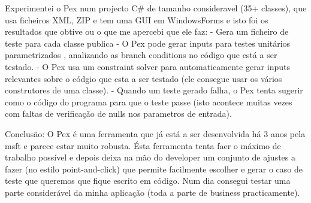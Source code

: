 \documentclass[citeauthoryear]{llncs}
\begin{document}
Experimentei o Pex num projecto C\# de tamanho consideravel (35+ classes), que usa ficheiros XML, ZIP e tem uma GUI em WindowsForms e isto foi os resultados que obtive ou o que me apercebi que ele faz:
- Gera um ficheiro de teste para cada classe publica
- O Pex pode gerar inputs para testes unitários parametrizados , analizando as branch conditions no código que está a ser testado.
- O Pex usa um constraint solver para automaticamente gerar inputs relevantes sobre o códgio que esta a ser testado (ele consegue usar os vários construtores de uma classe).
- Quando um teste gerado falha, o Pex tenta sugerir como o código do programa para que o teste passe (isto acontece muitas vezes com faltas de verificação de nulls nos parametros de entrada).

Conclusão: O Pex é uma ferramenta que já está a ser desenvolvida há 3 anos pela msft e parece estar muito robusta. Ésta ferramenta tenta faer o máximo de trabalho possível e depois deixa na mão do developer um conjunto de ajustes a fazer (no estilo point-and-click) que permite facilmente escolher e gerar o caso de teste que queremos que fique escrito em código.
Num dia consegui testar uma parte considerável da minha aplicação (toda a parte de business practicamente).




\end{document}
